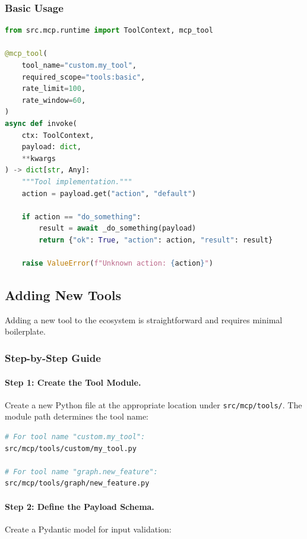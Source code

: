 \subsubsection{Basic Usage}

\begin{lstlisting}[language=Python, caption={Basic @mcp\_tool decorator usage}, label={lst:mcp-tool-basic}]
from src.mcp.runtime import ToolContext, mcp_tool

@mcp_tool(
    tool_name="custom.my_tool",
    required_scope="tools:basic",
    rate_limit=100,
    rate_window=60,
)
async def invoke(
    ctx: ToolContext,
    payload: dict,
    **kwargs
) -> dict[str, Any]:
    """Tool implementation."""
    action = payload.get("action", "default")
    
    if action == "do_something":
        result = await _do_something(payload)
        return {"ok": True, "action": action, "result": result}
    
    raise ValueError(f"Unknown action: {action}")
\end{lstlisting}

\subsection{Adding New Tools}
\label{subsec:adding-new-tools}

Adding a new tool to the ecosystem is straightforward and requires minimal boilerplate.

\subsubsection{Step-by-Step Guide}

\paragraph{Step 1: Create the Tool Module.}
Create a new Python file at the appropriate location under \texttt{src/mcp/tools/}. The module path determines the tool name:

\begin{lstlisting}[language=bash, caption={Tool module location determines tool name}, label={lst:tool-location}]
# For tool name "custom.my_tool":
src/mcp/tools/custom/my_tool.py

# For tool name "graph.new_feature":
src/mcp/tools/graph/new_feature.py
\end{lstlisting}

\paragraph{Step 2: Define the Payload Schema.}
Create a Pydantic model for input validation:

